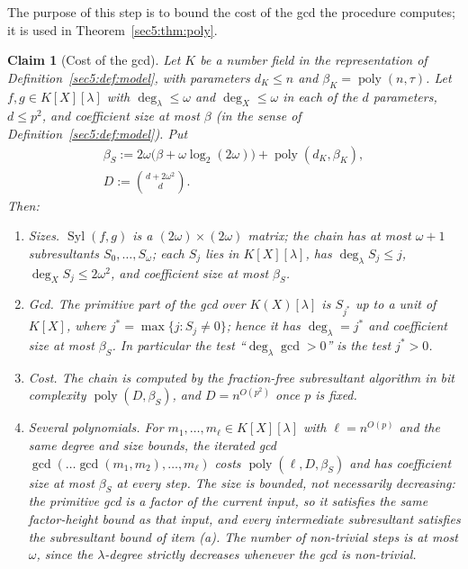 \documentclass[journal]{IEEEtran}
\theoremstyle{plainn}
\newtheorem{claim}{Claim}
\theoremstyle{remark}
\newcommand{\poly}{\operatorname{poly}}
\begin{document}
The purpose of this step is to bound the cost of the gcd the procedure computes; it is used in
Theorem~\ref{sec5:thm:poly}.

\begin{claim}[Cost of the gcd]\label{sec5:sub:subres}\label{sec5:lem:subres}\label{sec5:lem:multigcd}
Let $K$ be a number field in the representation of Definition~\ref{sec5:def:model}, with parameters
$d_K\le n$ and $\beta_K=\poly(n,\tau)$. Let $f,g\in K[X][\lambda]$ with $\deg_\lambda\le\omega$ and
$\deg_X\le\omega$ in each of the $d$ parameters, $d\le p^{2}$, and coefficient size at most $\beta$ (in
the sense of Definition~\ref{sec5:def:model}). Put
\begin{equation}\label{sec5:eq:sizes}
\begin{gathered}
\beta_S:=2\omega\bigl(\beta+\omega\log_2(2\omega)\bigr)+\poly(d_K,\beta_K),\\
D:=\binom{d+2\omega^{2}}{d}.
\end{gathered}
\end{equation}
Then:
\begin{enumerate}[label=(\alph*),leftmargin=*]
\item \emph{Sizes.} $\operatorname{Syl}(f,g)$ is a $(2\omega)\times(2\omega)$ matrix; the chain has at
most $\omega+1$ subresultants $S_0,\dots,S_\omega$; each $S_j$ lies in $K[X][\lambda]$, has
$\deg_\lambda S_j\le j$, $\deg_X S_j\le 2\omega^{2}$, and coefficient size at most $\beta_S$.
\item \emph{Gcd.} The primitive part of the gcd over $K(X)[\lambda]$ is $S_{j^{*}}$ up to a unit of
$K[X]$, where $j^{*}=\max\{j:S_j\neq0\}$; hence it has $\deg_\lambda=j^{*}$ and coefficient size at
most $\beta_S$. In particular the test ``$\deg_\lambda\gcd>0$'' is the test $j^{*}>0$.
\item \emph{Cost.} The chain is computed by the fraction-free subresultant algorithm in bit complexity
$\poly(D,\beta_S)$, and $D=n^{O(p^{2})}$ once $p$ is fixed.
\item \emph{Several polynomials.} For $m_1,\dots,m_\ell\in K[X][\lambda]$ with $\ell=n^{O(p)}$ and the
same degree and size bounds, the iterated gcd $\gcd(\dots\gcd(m_1,m_2),\dots,m_\ell)$ costs
$\poly(\ell,D,\beta_S)$ and has coefficient size at most $\beta_S$ at every step. The size is
\emph{bounded}, not necessarily decreasing: the primitive gcd is a factor of the current input, so it
satisfies the same factor-height bound as that input, and every intermediate subresultant satisfies the
subresultant bound of item (a). The number of non-trivial steps is at most $\omega$, since the
$\lambda$-degree strictly decreases whenever the gcd is non-trivial.
\end{enumerate}
\end{claim}
\end{document}
